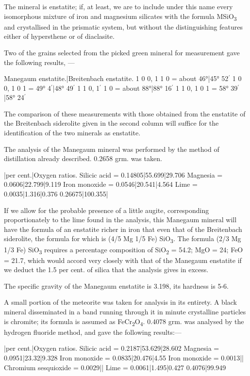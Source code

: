\documentclass[a4paper, 12pt, oneside]{article}
\begin{document}
The mineral is enstatite; if, at least, we are to include under this name every isomorphous mixture of iron and magnesium silicates with the formula MSiO\textsubscript{3} and crystallised in the prismatic system, but without the distinguishing features either of hypersthene or of diaclasite.

Two of the grains selected from the picked green mineral for measurement gave the following results, ---

Manegaum enstatite.|Breitenbach enstatite.  
1 0 0, 1 1 0 = about 46°|45° 52$^{\prime}$  
1 0 0, 1 0 1 = 49° 4$^{\prime}$|48° 49$^{\prime}$  
1 1 0, 1$^{\prime}$ 1 0 = about 88°|88° 16$^{\prime}$  
1 1 0, 1 0 1 = 58° 39$^{\prime}$|58° 24$^{\prime}$  

The comparison of these measurements with those obtained from the enstatite of the Breitenbach siderolite given in the second column will suffice for the identification of the two minerals as enstatite.

The analysis of the Manegaum mineral was performed by the method of distillation already described. 0.2658 grm. was taken.

|per cent.|Oxygen ratios.  
Silicic acid = 0.14805|55.699|29.706  
Magnesia = 0.0606|22.799|9.119  
Iron monoxide = 0.0546|20.541|4.564  
Lime = 0.0035|1.316|0.376  
0.26675|100.355|  

If we allow for the probable presence of a little augite, corresponding proportionately to the lime found in the analysis, this Manegaum mineral will have the formula of an enstatite richer in iron that even that of the Breitenbach siderolite, the formula for which is (4/5 Mg 1/5 Fe) SiO\textsubscript{3}. The formula (2/3 Mg 1/3 Fe) SiO\textsubscript{3} requires a percentage composition of SiO\textsubscript{2} = 54.2; MgO = 24; FeO = 21.7, which would accord very closely with that of the Manegaum enstatite if we deduct the 1.5 per cent. of silica that the analysis gives in excess.

The specific gravity of the Manegaum enstatite is 3.198, its hardness is 5-6.

A small portion of the meteorite was taken for analysis in its entirety. A black mineral disseminated in a band running through it in minute crystalline particles is chromite; its formula is assumed as FeCr\textsubscript{2}O\textsubscript{4}. 0.4078 grm. was analysed by the hydrogen fluoride method, and gave the following results:---

|per cent.|Oxygen ratios.  
Silicic acid = 0.2187|53.629|28.602  
Magnesia = 0.0951|23.32|9.328  
Iron monoxide = 0.0835|20.476|4.55  
Iron monoxide = 0.0013||  
Chromium sesquioxide = 0.0029||  
Lime = 0.0061|1.495|0.427  
0.4076|99.949  
\end{document}
